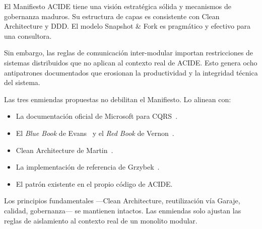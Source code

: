 \documentclass[conference]{IEEEtran}
\begin{document}
El Manifiesto ACIDE tiene una visi\'on estrat\'egica s\'olida y mecanismos de gobernanza maduros. Su estructura de capas es consistente con Clean Architecture y DDD. El modelo Snapshot \& Fork es pragm\'atico y efectivo para una consultora.

Sin embargo, las reglas de comunicaci\'on inter-modular importan restricciones de sistemas distribuidos que no aplican al contexto real de ACIDE. Esto genera ocho antipatrones documentados que erosionan la productividad y la integridad t\'ecnica del sistema.

Las tres enmiendas propuestas no debilitan el Manifiesto. Lo alinean con:
\begin{itemize}[leftmargin=1.5em, itemsep=1pt]
    \item La documentaci\'on oficial de Microsoft para CQRS~\cite{microsoft2023}.
    \item El \textit{Blue Book} de Evans~\cite{evans2003} y el \textit{Red Book} de Vernon~\cite{vernon2013}.
    \item Clean Architecture de Martin~\cite{martin2017}.
    \item La implementaci\'on de referencia de Grzybek~\cite{grzybek2019}.
    \item El patr\'on existente en el propio c\'odigo de ACIDE.
\end{itemize}

Los principios fundamentales ---Clean Architecture, reutilizaci\'on v\'ia Garaje, calidad, gobernanza--- se mantienen intactos. Las enmiendas solo ajustan las reglas de aislamiento al contexto real de un monolito modular.

\balance
\end{document}
